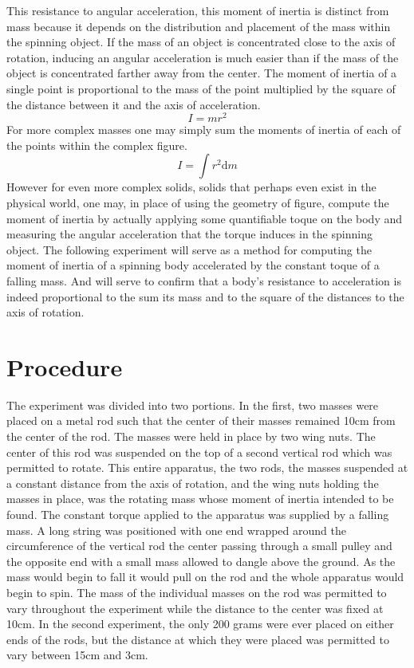 \documentclass[11pt]{article}
\begin{document}
This resistance to angular acceleration, this moment of inertia is distinct from mass because it depends on the distribution and placement of the mass within the spinning object. If the mass of an object is concentrated close to the axis of rotation, inducing an angular acceleration is much easier than if the mass of the object is concentrated farther away from the center. The moment of inertia of a single point is proportional to the mass of the point multiplied by the square of the distance between it and the axis of acceleration.
\begin{equation}
	I = m r^2
\end{equation}
For more complex masses one may simply sum the moments of inertia of each of the points within the complex figure.
\begin{equation}
I = \int r^2 \mathrm{d}m
\end{equation}
However for even more complex solids, solids that perhaps even exist in the physical world, one may, in place of using the geometry of figure, compute the moment of inertia by actually applying some quantifiable toque on the body and measuring the angular acceleration that the torque induces in the spinning object. The following experiment will serve as a method for computing the moment of inertia of a spinning body accelerated by the constant toque of a falling mass. And will serve to confirm that a body's resistance to acceleration is indeed proportional to the sum its mass and to the square of the distances to the axis of rotation.
  
\section{Procedure}
The experiment was divided into two portions. In the first, two masses were placed on a metal rod such that the center of their masses remained 10cm from the center of the rod. The masses were held in place by two wing nuts. The center of this rod was suspended on the top of a second vertical rod which was permitted to rotate. This entire apparatus, the two rods, the masses suspended at a constant distance from the axis of rotation, and the wing nuts holding the masses in place, was the rotating mass whose moment of inertia intended to be found. The constant torque applied to the apparatus was supplied by a falling mass. A long string was positioned with one end wrapped around the circumference of the vertical rod the center passing through a small pulley and the opposite end with a small mass allowed to dangle above the ground. As the mass would begin to fall it would pull on the rod and the whole apparatus would begin to spin. The mass of the individual masses on the rod was permitted to vary throughout the experiment while the distance to the center was fixed at 10cm.
In the second experiment, the only 200 grams were ever placed on either ends of the rods, but the distance at which they were placed was permitted to vary between 15cm and 3cm.
\end{document}
